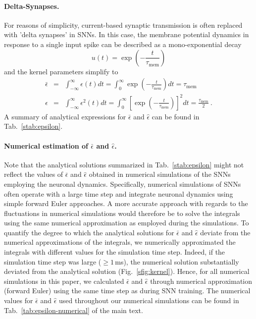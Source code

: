 \documentclass[11pt,a4paper]{article}
\begin{document}
\begin{refsection}
\paragraph{Delta-Synapses.} For reasons of simplicity, current-based synaptic
transmission is often replaced with 'delta synapses' in \acp{SNN}. 
In this case, the membrane potential dynamics in response to a single input
spike can be described as a mono-exponential decay
\begin{equation}
u(t) = \exp\left(-\frac{t}{\tau_{\text{mem}}}\right)
\end{equation}
and the kernel parameters simplify to
\begin{eqnarray}
\bar\epsilon &=& \int_{-\infty}^{\infty}\epsilon(t)dt = \int_{0}^{\infty}
\exp\left(-\frac{t}{\tau_{\text{mem}}}\right) dt = \tau_{\text{mem}}
\\
\hat\epsilon &=& \int_{-\infty}^{\infty}\epsilon^2(t)dt =
\int_{0}^{\infty}\left[ \exp\left(-\frac{t}{\tau_{\text{mem}}}\right)\right]^2
dt = \frac{\tau_{\text{mem}}}{2}~.
\end{eqnarray}
A summary of analytical expressions for $\bar\epsilon$ and $\hat\epsilon$ can be found in Tab.~\ref{stab:epsilon}.

\paragraph{Numerical estimation of $\bar\epsilon$ and $\hat\epsilon$.}
Note that the analytical solutions summarized in Tab.~\ref{stab:epsilon}
might not reflect the values of $\bar\epsilon$ and $\hat\epsilon$ obtained in numerical simulations
of the \acp{SNN} employing the neuronal dynamics. 
Specifically, numerical simulations of \acp{SNN} often operate with a large
time step and integrate neuronal dynamics using simple forward Euler
approaches. 
A more accurate approach with regards to the fluctuations in numerical
simulations would therefore be to solve the integrals using the same numerical
approximation as employed during the simulations.
To quantify the degree to which the analytical solutions for $\bar\epsilon$ and $\hat\epsilon$ 
deviate from the numerical approximations of the integrals, we numerically approximated the integrals
with different values for the simulation time step.
Indeed, if the simulation time step was large ($\geq 1$\,ms), the numerical solution substantially
deviated from the analytical solution (Fig.~\ref{sfig:kernel}).
Hence, for all numerical simulations in this paper, we calculated $\bar\epsilon$ and $\hat\epsilon$ through numerical approximation (forward Euler) using the same time step as during \ac{SNN} training. The numerical values for $\bar\epsilon$ and $\hat\epsilon$ used throughout our numerical simulations can be found in Tab.~\ref{tab:epsilon-numerical} of the main text.


\end{refsection}
\end{document}
